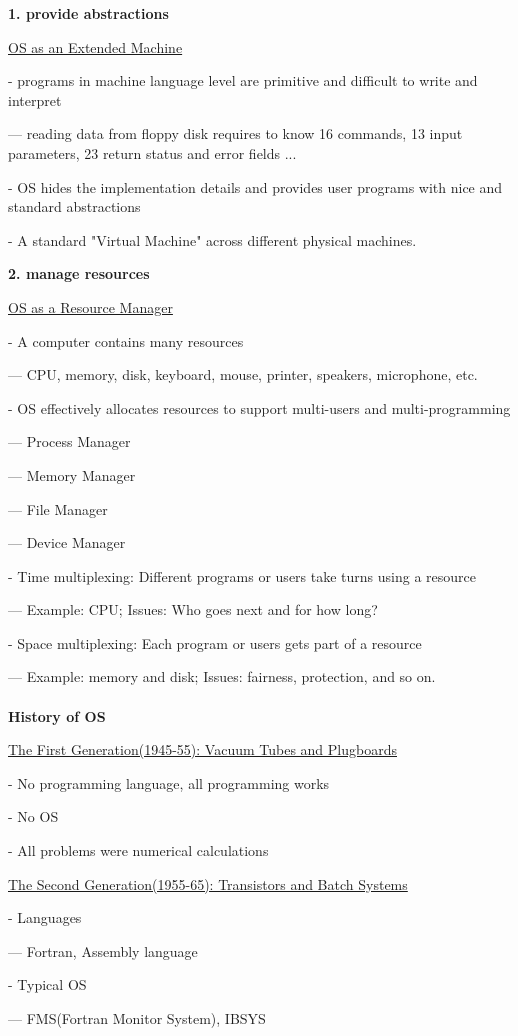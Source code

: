 \documentclass[]{report}
\begin{document}
\textbf{1. provide abstractions}

\underline{OS as an Extended Machine}

- programs in machine language level are primitive and difficult to write and interpret

--- reading data from floppy disk requires to know 16 commands, 13 input parameters, 23 return status and error fields ...

- OS hides the implementation details and provides user programs with nice and standard abstractions

- A standard "Virtual Machine" across different physical machines.

\textbf{2. manage resources}

\underline{OS as a Resource Manager}

- A computer contains many resources

--- CPU, memory, disk, keyboard, mouse, printer, speakers, microphone, etc.

- OS effectively allocates resources to support multi-users and multi-programming

--- Process Manager

--- Memory Manager

--- File Manager

--- Device Manager

- Time multiplexing: Different programs or users take turns using a resource

--- Example: CPU; Issues: Who goes next and for how long?

- Space multiplexing: Each program or users gets part of a resource

--- Example: memory and disk; Issues: fairness, protection, and so on.\\\\
\textbf{History of OS}

\underline{The First Generation(1945-55): Vacuum Tubes and Plugboards}

- No programming language, all programming works

- No OS

- All problems were numerical calculations

\underline{The Second Generation(1955-65): Transistors and Batch Systems}

- Languages

--- Fortran, Assembly language

- Typical OS

--- FMS(Fortran Monitor System), IBSYS
\end{document}

